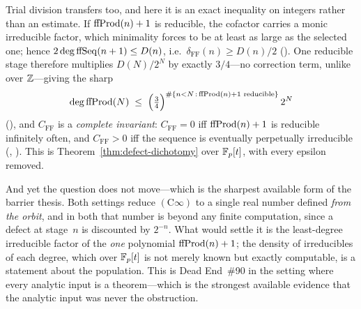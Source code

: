 Trial division transfers too, and here it is an exact inequality on
integers rather than an estimate.  If $\mathrm{ffProd}(n)+1$ is reducible, the
cofactor carries a monic irreducible factor, which minimality forces to be
at least as large as the selected one; hence
$2\deg \mathrm{ffSeq}(n+1) \leq D(n)$, i.e.\ $\delta_{\mathrm{FF}}(n) \geq D(n)/2$
().
One reducible stage therefore multiplies $D(N)/2^N$ by exactly $3/4$---no
correction term, unlike over $\mathbb{Z}$---giving the sharp
\[
  \deg \mathrm{ffProd}(N)
  \;\leq\;
  \Bigl(\tfrac34\Bigr)^{\#\{n<N\,:\,\mathrm{ffProd}(n)+1 \text{ reducible}\}}\, 2^{N}
\]
(), and
$C_{\mathrm{FF}}$ is a \emph{complete invariant}:
$C_{\mathrm{FF}} = 0$ iff $\mathrm{ffProd}(n)+1$ is reducible infinitely often,
and $C_{\mathrm{FF}} > 0$ iff the sequence is eventually perpetually
irreducible
(,
 ).
This is Theorem~\ref{thm:defect-dichotomy} over $\mathbb{F}_p[t]$, with every epsilon
removed.

And yet the question does not move---which is the sharpest available form
of the barrier thesis.  Both settings reduce $(\mathrm{C}\infty)$ to a
single real number defined \emph{from the orbit}, and in both that number
is beyond any finite computation, since a defect at stage~$n$ is
discounted by $2^{-n}$.  What would settle it is the least-degree
irreducible factor of the \emph{one} polynomial $\mathrm{ffProd}(n)+1$; the density
of irreducibles of each degree, which over $\mathbb{F}_p[t]$ is not merely known but
exactly computable, is a statement about the population.  This is Dead
End~\#90 in the setting where every analytic input is a theorem---which is
the strongest available evidence that the analytic input was never the
obstruction.

